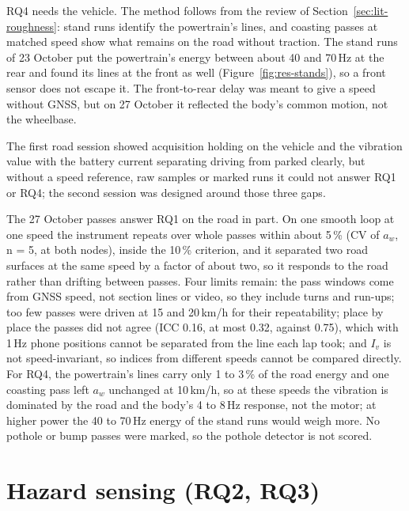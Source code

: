 RQ4 needs the vehicle. The method follows from the review of Section~\ref{sec:lit-roughness}: stand runs identify the powertrain's lines, and coasting passes at matched speed show what remains on the road without traction. The stand runs of 23 October put the powertrain's energy between about 40 and 70\,Hz at the rear and found its lines at the front as well (Figure~\ref{fig:res-stands}), so a front sensor does not escape it. The front-to-rear delay was meant to give a speed without GNSS, but on 27 October it reflected the body's common motion, not the wheelbase.

The first road session showed acquisition holding on the vehicle and the vibration value with the battery current separating driving from parked clearly, but without a speed reference, raw samples or marked runs it could not answer RQ1 or RQ4; the second session was designed around those three gaps.

The 27 October passes answer RQ1 on the road in part. On one smooth loop at one speed the instrument repeats over whole passes within about 5\,\% (CV of $a_w$, n = 5, at both nodes), inside the 10\,\% criterion, and it separated two road surfaces at the same speed by a factor of about two, so it responds to the road rather than drifting between passes. Four limits remain: the pass windows come from GNSS speed, not section lines or video, so they include turns and run-ups; too few passes were driven at 15 and 20\,km/h for their repeatability; place by place the passes did not agree (ICC 0.16, at most 0.32, against 0.75), which with 1\,Hz phone positions cannot be separated from the line each lap took; and $I_v$ is not speed-invariant, so indices from different speeds cannot be compared directly. For RQ4, the powertrain's lines carry only 1 to 3\,\% of the road energy and one coasting pass left $a_w$ unchanged at 10\,km/h, so at these speeds the vibration is dominated by the road and the body's 4 to 8\,Hz response, not the motor; at higher power the 40 to 70\,Hz energy of the stand runs would weigh more. No pothole or bump passes were marked, so the pothole detector is not scored.

\section{Hazard sensing (RQ2, RQ3)}
\label{sec:disc-hazard}

